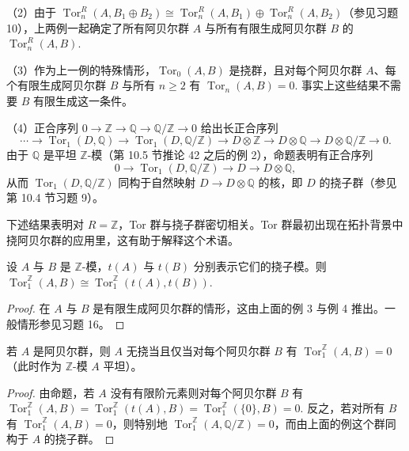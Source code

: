 （2）由于 \(\operatorname{Tor}_n^R(A, B_1 \oplus B_2) \cong \operatorname{Tor}_n^R(A, B_1) \oplus \operatorname{Tor}_n^R(A, B_2)\)（参见习题 10），上两例一起确定了所有阿贝尔群 \(A\) 与所有有限生成阿贝尔群 \(B\) 的 \(\operatorname{Tor}_n^R(A, B)\).

（3）作为上一例的特殊情形，\(\operatorname{Tor}_0(A, B)\) 是挠群，且对每个阿贝尔群 \(A\)、每个有限生成阿贝尔群 \(B\) 与所有 \(n \geq 2\) 有 \(\operatorname{Tor}_n(A, B) = 0\). 事实上这些结果不需要 \(B\) 有限生成这一条件。

（4）正合序列 \(0 \to \mathbb{Z} \to \mathbb{Q} \to \mathbb{Q}/\mathbb{Z} \to 0\) 给出长正合序列
\[
\cdots \to \operatorname{Tor}_1(D, \mathbb{Q}) \to \operatorname{Tor}_1(D, \mathbb{Q}/\mathbb{Z}) \to D \otimes \mathbb{Z} \to D \otimes \mathbb{Q} \to D \otimes \mathbb{Q}/\mathbb{Z} \to 0.
\]
由于 \(\mathbb{Q}\) 是平坦 \(\mathbb{Z}\)-模（第 10.5 节推论 42 之后的例 2），命题表明有正合序列
\[
0 \to \operatorname{Tor}_1(D, \mathbb{Q}/\mathbb{Z}) \to D \to D \otimes \mathbb{Q},
\]
从而 \(\operatorname{Tor}_1(D, \mathbb{Q}/\mathbb{Z})\) 同构于自然映射 \(D \to D \otimes \mathbb{Q}\) 的核，即 \(D\) 的挠子群（参见第 10.4 节习题 9）。

下述结果表明对 \(R = \mathbb{Z}\)，Tor 群与挠子群密切相关。Tor 群最初出现在拓扑背景中挠阿贝尔群的应用里，这有助于解释这个术语。

\begin{proposition}\label{pro:17.17}
设 \(A\) 与 \(B\) 是 \(\mathbb{Z}\)-模，\(t(A)\) 与 \(t(B)\) 分别表示它们的挠子模。则 \(\operatorname{Tor}_1^{\mathbb{Z}}(A, B) \cong \operatorname{Tor}_1^{\mathbb{Z}}(t(A), t(B))\).
\end{proposition}

\begin{proof}
在 \(A\) 与 \(B\) 是有限生成阿贝尔群的情形，这由上面的例 3 与例 4 推出。一般情形参见习题 16。
\end{proof}

\begin{corollary}\label{cor:17.18}
若 \(A\) 是阿贝尔群，则 \(A\) 无挠当且仅当对每个阿贝尔群 \(B\) 有 \(\operatorname{Tor}_1^{\mathbb{Z}}(A, B) = 0\)（此时作为 \(\mathbb{Z}\)-模 \(A\) 平坦）。
\end{corollary}

\begin{proof}
由命题，若 \(A\) 没有有限阶元素则对每个阿贝尔群 \(B\) 有 \(\operatorname{Tor}_1^{\mathbb{Z}}(A, B) = \operatorname{Tor}_1^{\mathbb{Z}}(t(A), B) = \operatorname{Tor}_1^{\mathbb{Z}}(\{0\}, B) = 0\). 反之，若对所有 \(B\) 有 \(\operatorname{Tor}_1^{\mathbb{Z}}(A, B) = 0\)，则特别地 \(\operatorname{Tor}_1^{\mathbb{Z}}(A, \mathbb{Q}/\mathbb{Z}) = 0\)，而由上面的例这个群同构于 \(A\) 的挠子群。
\end{proof}

